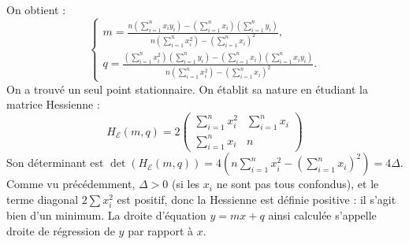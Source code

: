 {\begin{enumerate}
{			On obtient :
			$$
			\left\{\begin{array}{l}
				m=\frac{n\left(\sum_{i=1}^{n} x_{i} y_{i}\right) - \left(\sum_{i=1}^{n} x_{i}\right)\left(\sum_{i=1}^{n} y_{i}\right)}{n\left(\sum_{i=1}^{n} x_{i}^{2}\right) - \left(\sum_{i=1}^{n} x_{i}\right)^{2}}, \\
				q=\frac{\left(\sum_{i=1}^{n} x_{i}^2\right)\left(\sum_{i=1}^{n} y_{i}\right)-\left(\sum_{i=1}^{n} x_{i}\right)\left(\sum_{i=1}^{n} x_{i} y_{i}\right)}{n\left(\sum_{i=1}^{n} x_{i}^{2}\right) - \left(\sum_{i=1}^{n} x_{i}\right)^{2}} .
			\end{array}\right.
			$$
			On a trouvé un seul point stationnaire. On établit sa nature en étudiant la matrice Hessienne :
			$$
			H_{\mathscr{E}}(m, q)=2\left(\begin{array}{cc}
				\sum_{i=1}^{n} x_{i}^{2} & \sum_{i=1}^{n} x_{i} \\
				\sum_{i=1}^{n} x_{i} & n
			\end{array}\right)
			$$
			Son déterminant est $\operatorname{det}\left(H_{\mathscr{E}}(m, q)\right)=4\left(n \sum_{i=1}^{n} x_{i}^{2}-\left(\sum_{i=1}^{n} x_{i}\right)^{2}\right) = 4\Delta$. Comme vu précédemment, $\Delta > 0$ (si les $x_i$ ne sont pas tous confondus), et le terme diagonal $2\sum x_i^2$ est positif, donc la Hessienne est définie positive : il s'agit bien d'un minimum. La droite d'équation $y=m x+q$ ainsi calculée s'appelle droite de régression de $y$ par rapport à $x$.
			
			
		}
\end{enumerate}}